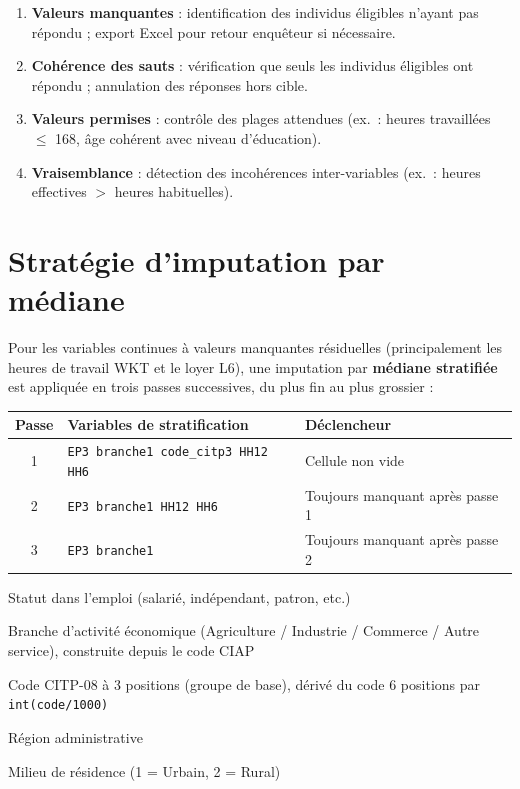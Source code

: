 \documentclass[11pt, a4paper]{article}
\begin{document}
\begin{enumerate}[topsep=3pt, itemsep=2pt]
  \item \textbf{Valeurs manquantes} : identification des individus éligibles
    n'ayant pas répondu ; export Excel pour retour enquêteur si nécessaire.
  \item \textbf{Cohérence des sauts} : vérification que seuls les individus
    éligibles ont répondu ; annulation des réponses hors cible.
  \item \textbf{Valeurs permises} : contrôle des plages attendues
    (ex.~: heures travaillées $\leq$ 168, âge cohérent avec niveau d'éducation).
  \item \textbf{Vraisemblance} : détection des incohérences inter-variables
    (ex.~: heures effectives $>$ heures habituelles).
\end{enumerate}

\section{Stratégie d'imputation par médiane}

Pour les variables continues à valeurs manquantes résiduelles
(principalement les heures de travail WKT et le loyer L6),
une imputation par \textbf{médiane stratifiée} est appliquée
en trois passes successives, du plus fin au plus grossier :

\vspace{0.3cm}
\begin{center}
\begin{tabular}{clp{7.5cm}}
\toprule
\textbf{Passe} & \textbf{Variables de stratification} & \textbf{Déclencheur} \\
\midrule
1 & \texttt{EP3 branche1 code\_citp3 HH12 HH6}
  & Cellule non vide \\
2 & \texttt{EP3 branche1 HH12 HH6}
  & Toujours manquant après passe 1 \\
3 & \texttt{EP3 branche1}
  & Toujours manquant après passe 2 \\
\bottomrule
\end{tabular}
\end{center}

\vspace{0.3cm}
\begin{description}[topsep=2pt, itemsep=2pt]
  \item[\texttt{EP3}] Statut dans l'emploi (salarié, indépendant, patron, etc.)
  \item[\texttt{branche1}] Branche d'activité économique (Agriculture / Industrie /
    Commerce / Autre service), construite depuis le code CIAP
  \item[\texttt{code\_citp3}] Code CITP-08 à 3 positions (groupe de base),
    dérivé du code 6 positions par \texttt{int(code/1000)}
  \item[\texttt{HH12}] Région administrative
  \item[\texttt{HH6}] Milieu de résidence (1 = Urbain, 2 = Rural)
\end{description}
\end{document}
